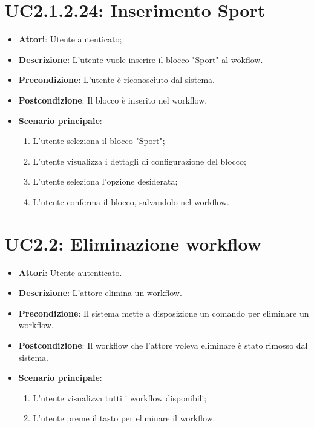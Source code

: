 \section{UC2.1.2.24: Inserimento Sport}
\label{UC2.1.2.24}
\begin{itemize}
	\item \textbf{Attori}: Utente autenticato;
	\item \textbf{Descrizione}: L'utente vuole inserire il blocco "Sport" al wokflow.
	\item \textbf{Precondizione}: L'utente è riconosciuto dal sistema.
	\item \textbf{Postcondizione}: Il blocco è inserito nel workflow.
	\item \textbf{Scenario principale}:
	\begin{enumerate} \item L'utente seleziona il blocco "Sport";  \item L'utente visualizza i dettagli di configurazione del blocco; \item  L'utente seleziona l'opzione desiderata;  \item  L'utente conferma il blocco, salvandolo nel workflow.\end{enumerate}
\end{itemize}


\section{UC2.2: Eliminazione workflow}
\label{UC2.2}
\begin{itemize}
	\item \textbf{Attori}: Utente autenticato.
	\item \textbf{Descrizione}: L'attore elimina un workflow.
	\item \textbf{Precondizione}: Il sistema mette a disposizione un comando per eliminare un workflow.
	\item \textbf{Postcondizione}: Il workflow che l'attore voleva eliminare è stato rimosso dal sistema.
	\item \textbf{Scenario principale}:
	\begin{enumerate} \item L'utente visualizza tutti i workflow disponibili; \item L'utente preme il tasto per eliminare il workflow.\end{enumerate}
\end{itemize}


